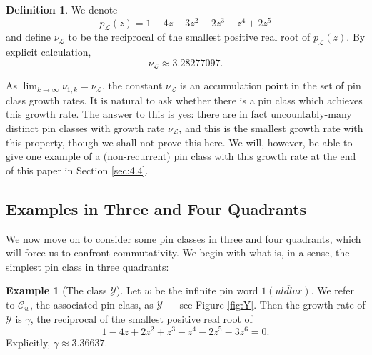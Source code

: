 \documentclass[11pt,a4paper]{article}
\theoremstyle{definition}
\newtheorem{defn}[thm]{Definition}
\newtheorem{example}[thm]{Example}
\begin{document}
\begin{defn} \label{def:nul}
We denote
\[
p_{\mathcal{L}}(z) = 1 - 4z + 3z^2 - 2z^3 - z^4 + 2z^5
\]
and define $\nu_{\mathcal{L}}$ to be the reciprocal of the smallest positive real root of $p_{\mathcal{L}}(z)$. By explicit calculation,
\[
\nu_{\mathcal{L}} \approx 3.28277097.
\]
\end{defn}

As $\lim_{k \rightarrow \infty}\nu_{1,k} = \nu_{\mathcal{L}}$, the constant $\nu_{\mathcal{L}}$ is an accumulation point in the set of pin class growth rates. It is natural to ask whether there is a pin class which achieves this growth rate. The answer to this is yes: there are in fact uncountably-many distinct pin classes with growth rate $\nu_{\mathcal{L}}$, and this is the smallest growth rate with this property, though we shall not prove this here. We will, however, be able to give one example of a (non-recurrent) pin class with this growth rate at the end of this paper in Section \ref{sec:4.4}.

\subsection{Examples in Three and Four Quadrants} \label{sec:3.8}

We now move on to consider some pin classes in three and four quadrants, which will force us to confront commutativity. We begin with what is, in a sense, the simplest pin class in three quadrants:

\begin{example}[The class $\mathcal{Y}$] \label{ex:gammadef}
Let $w$ be the infinite pin word $1\overline{(uldlur)}$. We refer to $\mathcal{C}_{w}$, the associated pin class, as $\mathcal{Y}$ --- see Figure \ref{fig:Y}. Then the growth rate of $\mathcal{Y}$ is $\gamma$, the reciprocal of the smallest positive real root of
\[
1 - 4z + 2z^2 + z^3 - z^4 - 2z^5 - 3z^6 = 0.
\]
Explicitly, $\gamma \approx 3.36637$.
\end{example}
\end{document}
